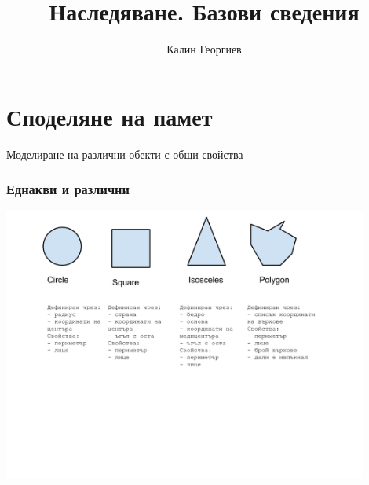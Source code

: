 \documentclass{beamer}
\begin{document}
\title[Обектно ориентирано програмиране]{Наследяване. Базови сведения} 
\author{Калин Георгиев} 
\frame{\titlepage} 

\section{Споделяне на памет} 


\begin{frame}
\centerline{Моделиране на различни обекти с общи свойства}
\end{frame}


\begin{frame}[fragile]
\frametitle{Еднакви и различни}

\begin{center}
\includegraphics[width=12.0cm]{images/figures}
\end{center}


\end{frame}
\end{document}

